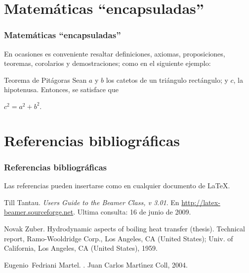 \documentclass[xcolor=pdftex,dvinames,table]{beamer}
\begin{document}
\section{Matemáticas ``encapsuladas''}%
\begin{frame}
\frametitle{Matemáticas ``encapsuladas''}
En ocasiones es conveniente resaltar definiciones, axiomas, proposiciones, teoremas, corolarios y demostraciones; como en el siguiente ejemplo: \\
\begin{block}{Teorema de Pitágoras}
Sean $a$ y $b$ los catetos de un triángulo rectángulo; y $c$, la hipotenusa. Entonces, se satisface que\\
\begin{center}
$c^{2}=a^{2}+b^{2}$.
\end{center}
\end{block}
\end{frame}


\section{Referencias bibliográficas}%
\begin{frame}
\frametitle{Referencias bibliográficas}
Las referencias pueden insertarse como en cualquier documento de \LaTeX.

\begin{thebibliography}{1}
Till Tantau. \emph{Users Guide to the Beamer Class,
v 3.01}. En \url{http://latex-beamer.sourceforge.net}.
Ultima consulta: 16 de junio de 2009.
\end{thebibliography}

\end{frame}

\begin{frame}

\begin{thebibliography}{1}
Novak Zuber.
\newblock Hydrodynamic aspects of boiling heat transfer (thesis).
\newblock Technical report, Ramo-Wooldridge Corp., Los Angeles, CA (United
  States); Univ. of California, Los Angeles, CA (United States), 1959.
\end{thebibliography}

\begin{thebibliography}{1}
Eugenio~Fedriani Martel.
.
\newblock Juan Carlos Mart{\'\i}nez Coll, 2004.
\end{thebibliography}

\end{frame}
\end{document}
